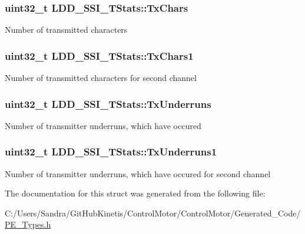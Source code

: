 \subsubsection[{\texorpdfstring{Tx\+Chars}{TxChars}}]{\setlength{\rightskip}{0pt plus 5cm}uint32\+\_\+t L\+D\+D\+\_\+\+S\+S\+I\+\_\+\+T\+Stats\+::\+Tx\+Chars}\hypertarget{struct_l_d_d___s_s_i___t_stats_abaff1182d41c2c211ce8da947df77bbd}{}\label{struct_l_d_d___s_s_i___t_stats_abaff1182d41c2c211ce8da947df77bbd}
Number of transmitted characters 
\subsubsection[{\texorpdfstring{Tx\+Chars1}{TxChars1}}]{\setlength{\rightskip}{0pt plus 5cm}uint32\+\_\+t L\+D\+D\+\_\+\+S\+S\+I\+\_\+\+T\+Stats\+::\+Tx\+Chars1}\hypertarget{struct_l_d_d___s_s_i___t_stats_a0721d681a52cc566e4c89de10e962923}{}\label{struct_l_d_d___s_s_i___t_stats_a0721d681a52cc566e4c89de10e962923}
Number of transmitted characters for second channel 
\subsubsection[{\texorpdfstring{Tx\+Underruns}{TxUnderruns}}]{\setlength{\rightskip}{0pt plus 5cm}uint32\+\_\+t L\+D\+D\+\_\+\+S\+S\+I\+\_\+\+T\+Stats\+::\+Tx\+Underruns}\hypertarget{struct_l_d_d___s_s_i___t_stats_a5ac8911e76989013a9a4757a90aa5660}{}\label{struct_l_d_d___s_s_i___t_stats_a5ac8911e76989013a9a4757a90aa5660}
Number of transmitter underruns, which have occured 
\subsubsection[{\texorpdfstring{Tx\+Underruns1}{TxUnderruns1}}]{\setlength{\rightskip}{0pt plus 5cm}uint32\+\_\+t L\+D\+D\+\_\+\+S\+S\+I\+\_\+\+T\+Stats\+::\+Tx\+Underruns1}\hypertarget{struct_l_d_d___s_s_i___t_stats_a14fb329147ead1d214cd25ffd3b39f6d}{}\label{struct_l_d_d___s_s_i___t_stats_a14fb329147ead1d214cd25ffd3b39f6d}
Number of transmitter underruns, which have occured for second channel 

The documentation for this struct was generated from the following file\+:\begin{DoxyCompactItemize}
\item 
C\+:/\+Users/\+Sandra/\+Git\+Hub\+Kinetis/\+Control\+Motor/\+Control\+Motor/\+Generated\+\_\+\+Code/\hyperlink{_p_e___types_8h}{P\+E\+\_\+\+Types.\+h}\end{DoxyCompactItemize}
